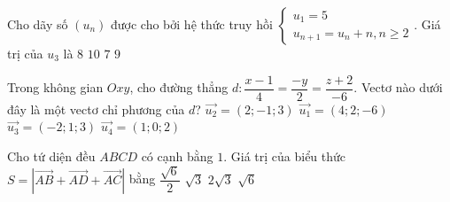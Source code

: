 \begin{ex}%
	Cho dãy số $(u_n)$ được cho bởi hệ thức truy hồi $\begin{cases} u_1 = 5 \\ u_{n+1} = u_n + n, n \ge 2 \end{cases}$. Giá trị của $u_3$ là
	\choice
	{\True $8$}
	{$10$}
	{$7$}
	{$9$}
\end{ex}

\begin{ex}%
	Trong không gian $Oxy$, cho đường thẳng $d\colon\dfrac{x-1}{4} = \dfrac{-y}{2} = \dfrac{z+2}{-6}$. Vectơ nào dưới đây là một vectơ chỉ phương của $d$?
	\choice
	{$\overrightarrow{u_2} = (2;-1;3)$}
	{$\overrightarrow{u_1} = (4;2;-6)$}
	{$\overrightarrow{u_3} = (-2;1;3)$}
	{$\overrightarrow{u_4} = (1;0;2)$}
\end{ex}

\begin{ex}%
	Cho tứ diện đều $ABCD$ có cạnh bằng $1$. Giá trị của biểu thức $S=\left|\overrightarrow{AB}+\overrightarrow{AD}+\overrightarrow{AC}\right|$ bằng
	\choice
	{$\dfrac{\sqrt{6}}{2}$}
	{$\sqrt{3}$}
	{$2\sqrt{3}$}
	{\True $\sqrt{6}$}
\end{ex}

